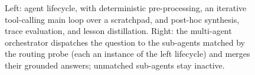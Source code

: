 \begin{figure}[t]
{
    }
    \caption{Left: agent lifecycle, with deterministic pre-processing,
    an iterative tool-calling main loop over a scratchpad, and post-hoc
    synthesis, trace evaluation, and lesson distillation. Right: the
    multi-agent orchestrator dispatches the question to the sub-agents
    matched by the routing probe (each an instance of the left
    lifecycle) and merges their grounded answers; unmatched sub-agents
    stay inactive.}
    \label{fig:arch}
\end{figure}
